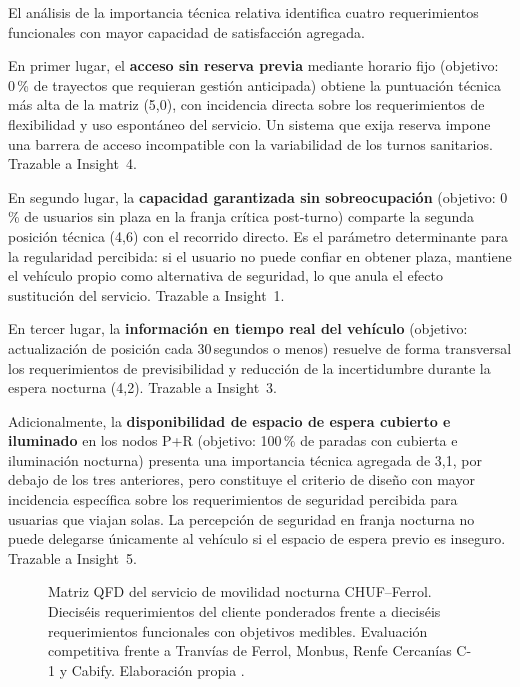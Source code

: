 El análisis de la importancia técnica relativa identifica cuatro
requerimientos funcionales con mayor capacidad de satisfacción agregada.

En primer lugar, el \textbf{acceso sin reserva previa} mediante horario
fijo (objetivo: 0\,\% de trayectos que requieran gestión anticipada)
obtiene la puntuación técnica más alta de la matriz (5,0), con incidencia
directa sobre los requerimientos de flexibilidad y uso espontáneo del
servicio. Un sistema que exija reserva impone una barrera de acceso
incompatible con la variabilidad de los turnos sanitarios. Trazable a
Insight~4.

En segundo lugar, la \textbf{capacidad garantizada sin sobreocupación}
(objetivo: 0\,\% de usuarios sin plaza en la franja crítica post-turno)
comparte la segunda posición técnica (4,6) con el recorrido directo.
Es el parámetro determinante para la regularidad percibida: si el usuario
no puede confiar en obtener plaza, mantiene el vehículo propio como
alternativa de seguridad, lo que anula el efecto sustitución del servicio.
Trazable a Insight~1.

En tercer lugar, la \textbf{información en tiempo real del vehículo}
(objetivo: actualización de posición cada 30\,segundos o menos) resuelve
de forma transversal los requerimientos de previsibilidad y reducción de
la incertidumbre durante la espera nocturna (4,2). Trazable a Insight~3.

Adicionalmente, la \textbf{disponibilidad de espacio de espera cubierto
e iluminado} en los nodos P+R (objetivo: 100\,\% de paradas con cubierta
e iluminación nocturna) presenta una importancia técnica agregada de 3,1,
por debajo de los tres anteriores, pero constituye el criterio de diseño
con mayor incidencia específica sobre los requerimientos de seguridad
percibida para usuarias que viajan solas. La percepción de seguridad en
franja nocturna no puede delegarse únicamente al vehículo si el espacio
de espera previo es inseguro. Trazable a Insight~5.

\begin{figure}[htbp]
	\centering
	\fbox{\rule{0pt}{6cm}\rule{0.95\textwidth}{0pt}}
	\caption{Matriz QFD del servicio de movilidad nocturna CHUF--Ferrol.
		Dieciséis requerimientos del cliente ponderados frente a dieciséis
		requerimientos funcionales con objetivos medibles. Evaluación competitiva
		frente a Tranvías de Ferrol, Monbus, Renfe Cercanías C-1 y Cabify.
		Elaboración propia \parencite{LouridoRegueira2026}.}
	\label{fig:qfd}
\end{figure}

